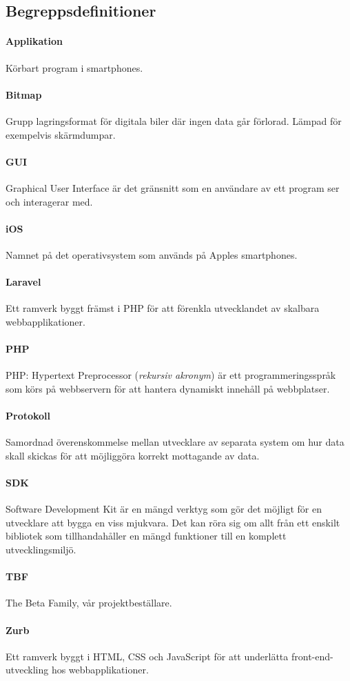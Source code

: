 \subsection{Begreppsdefinitioner}

\paragraph{Applikation} Körbart program i smartphones.

\paragraph{Bitmap} Grupp lagringsformat för digitala biler där ingen data går förlorad. Lämpad för exempelvis skärmdumpar.

\paragraph{GUI} Graphical User Interface är det gränsnitt som en användare av ett program ser och interagerar med.

\paragraph{iOS} Namnet på det operativsystem som används på Apples smartphones.

\paragraph{Laravel} Ett ramverk byggt främst i PHP för att förenkla utvecklandet av skalbara webbapplikationer\parencite{laravel}.

\paragraph{PHP} PHP: Hypertext Preprocessor (\textit{rekursiv akronym}) är ett programmeringsspråk som körs på webbservern för att hantera dynamiskt innehåll på webbplatser.

\paragraph{Protokoll} Samordnad överenskommelse mellan utvecklare av separata system om hur data skall skickas för att möjliggöra korrekt mottagande av data.

\paragraph{SDK} Software Development Kit är en mängd verktyg som gör det möjligt för en utvecklare att bygga en viss mjukvara. Det kan röra sig om allt från ett enskilt bibliotek som tillhandahåller en mängd funktioner till en komplett utvecklingsmiljö.

\paragraph{TBF} The Beta Family, vår projektbeställare.

\paragraph{Zurb} Ett ramverk byggt i HTML, CSS och JavaScript för att underlätta front-end-utveckling hos webbapplikationer\parencite{zurb}.
